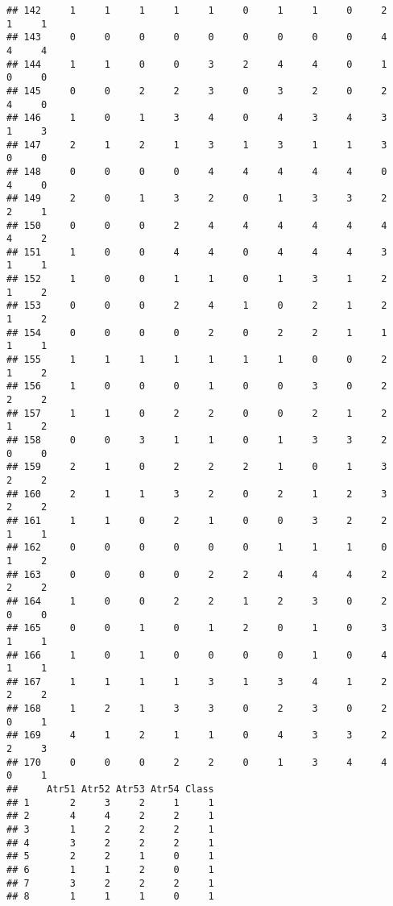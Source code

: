 \documentclass[
]{article}
\begin{document}
\begin{verbatim}
## 142     1     1     1     1     1     0     1     1     0     2     1     1
## 143     0     0     0     0     0     0     0     0     0     4     4     4
## 144     1     1     0     0     3     2     4     4     0     1     0     0
## 145     0     0     2     2     3     0     3     2     0     2     4     0
## 146     1     0     1     3     4     0     4     3     4     3     1     3
## 147     2     1     2     1     3     1     3     1     1     3     0     0
## 148     0     0     0     0     4     4     4     4     4     0     4     0
## 149     2     0     1     3     2     0     1     3     3     2     2     1
## 150     0     0     0     2     4     4     4     4     4     4     4     2
## 151     1     0     0     4     4     0     4     4     4     3     1     1
## 152     1     0     0     1     1     0     1     3     1     2     1     2
## 153     0     0     0     2     4     1     0     2     1     2     1     2
## 154     0     0     0     0     2     0     2     2     1     1     1     1
## 155     1     1     1     1     1     1     1     0     0     2     1     2
## 156     1     0     0     0     1     0     0     3     0     2     2     2
## 157     1     1     0     2     2     0     0     2     1     2     1     2
## 158     0     0     3     1     1     0     1     3     3     2     0     0
## 159     2     1     0     2     2     2     1     0     1     3     2     2
## 160     2     1     1     3     2     0     2     1     2     3     2     2
## 161     1     1     0     2     1     0     0     3     2     2     1     1
## 162     0     0     0     0     0     0     1     1     1     0     1     2
## 163     0     0     0     0     2     2     4     4     4     2     2     2
## 164     1     0     0     2     2     1     2     3     0     2     0     0
## 165     0     0     1     0     1     2     0     1     0     3     1     1
## 166     1     0     1     0     0     0     0     1     0     4     1     1
## 167     1     1     1     1     3     1     3     4     1     2     2     2
## 168     1     2     1     3     3     0     2     3     0     2     0     1
## 169     4     1     2     1     1     0     4     3     3     2     2     3
## 170     0     0     0     2     2     0     1     3     4     4     0     1
##     Atr51 Atr52 Atr53 Atr54 Class
## 1       2     3     2     1     1
## 2       4     4     2     2     1
## 3       1     2     2     2     1
## 4       3     2     2     2     1
## 5       2     2     1     0     1
## 6       1     1     2     0     1
## 7       3     2     2     2     1
## 8       1     1     1     0     1

\end{verbatim}
\end{document}
